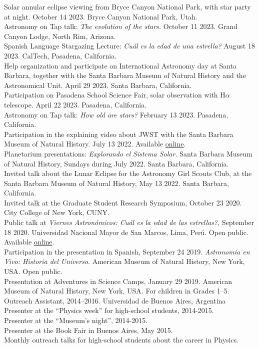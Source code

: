 \documentclass[10pt]{cv}
\newcommand\tab[1][1cm]{\hspace*{#1}}
\begin{document}
\begin{llist}

Solar annular eclipse viewing from Bryce Canyon National Park, with star party at night. October 14 2023. Bryce Canyon National Park, Utah.  \\
Astronomy on Tap talk: \textit{The evolution of the stars.} October 11 2023. Grand Canyon Lodge, North Rim, Arizona.\\
Spanish Language Stargazing Lecture: \textit{Cu\'al es la edad de una estrella?} August 18 2023. CalTech, Pasadena, California. \\
Help organization and participate on International Astronomy day at Santa Barbara, together with the Santa Barbara Museum of Natural History and the Astronomical Unit. April 29 2023. Santa Barbara, California.\\
Participation on Pasadena School Science Fair, solar observation with H$\alpha$ telescope. April 22 2023. Pasadena, California. \\
Astronomy on Tap talk: \textit{How old are stars?} February 13 2023. Pasadena, California.\\
Participation in the explaining video about JWST with the Santa Barbara Museum of Natural History. July 13 2022. Available \href{https://www.youtube.com/watch?v=LV8N0OSEJOg}{online}.\\
Planetarium presentations: \textit{Explorando el Sistema Solar.} Santa Barbara Museum of Natural History, Sundays during July 2022. Santa Barbara, California. \\
Invited talk about the Lunar Eclipse for the Astronomy Girl Scouts Club, at the Santa Barbara Museum of Natural History, May 13 2022. Santa Barbara, California. \\
Invited talk at the Graduate Student Research Symposium, October 23 2020. City College of New York, CUNY.	\\
Public talk at \textit{Viernes Astron\'omicos: Cu\'al es la edad de las estrellas?}, September 18 2020. Universidad Nacional Mayor de San Marcos, Lima, Per\'u. Open public. Available \href{https://www.youtube.com/watch?v=QOlgG1b41hU&ab_channel=AstronomySanMarcos}{online}.\\
Participation in the presentation in Spanish, September 24 2019. \textit{Astronom\'ia en Vivo: Historia del Universo}. American Museum of Natural History, New York, USA. Open public.\\
Presentation at Adventures in Science Camps, January 29 2019. American Museum of Natural History, New York, USA. For children in Grades 1--5.\\
Outreach Assistant, 2014--2016. Universidad de Buenos Aires, Argentina\\
\tab Presenter at the ``Physics week'' for high-school students, 2014-2015.\\
\tab Presenter at the ``­Museum's night'', 2014-2015.\\
\tab Presenter at the Book Fair in Buenos Aires, May 2015.\\
\tab Monthly outreach talks for high-school students about the career in Physics.


\end{llist}
\end{document}
